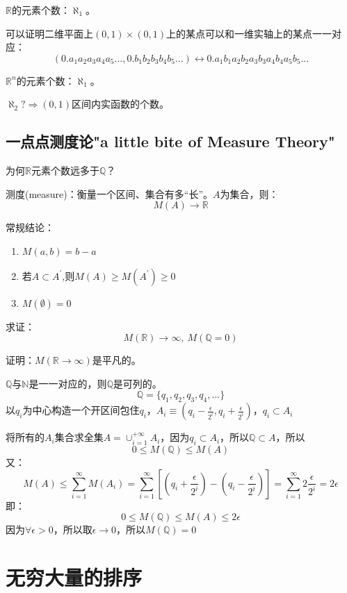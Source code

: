 $\mathbb{R}$的元素个数：$\aleph_1$。

可以证明二维平面上$(0,1)\times(0,1)$上的某点可以和一维实轴上的某点一一对应：
\[(0.a_{1}a_{2}a_{3}a_{4}a_{5}...,0.b_{1}b_{2}b_{3}b_{4}b_{5}...)\leftrightarrow0.a_{1}b_{1}a_{2}b_{2}a_{3}b_{3}a_{4}b_{4}a_{5}b_{5}...\]

$\mathbb{R}^n$的元素个数：$\aleph_1$。

$\aleph_2?\Rightarrow(0,1)$区间内实函数的个数。

\subsection{一点点测度论"a little bite of Measure Theory"}
\label{yddcdl}

为何$\mathbb{R}$元素个数远多于$\mathbb{Q}$？

测度(measure)：衡量一个区间、集合有多“长”。$A$为集合，则：
\[M(A)\rightarrow\mathbb{R}\]

常规结论：

\begin{enumerate}[fullwidth,itemindent=2em]
	\item $M{(a,b)} = b-a$
	\item 若$A\subset A^\prime$,则$M(A) \ge M(A^\prime) \ge 0$
	\item $M(\emptyset) = 0$
\end{enumerate}

求证：
\begin{equation}
M(\mathbb{R})\rightarrow \infty,\ M(\mathbb{Q}=0)
\end{equation}

证明：$M(\mathbb{R}\rightarrow \infty)$是平凡的。

$\mathbb{Q}$与$\mathbb{N}$是一一对应的，则$\mathbb{Q}$是可列的。\\
\[\mathbb{Q}=\{q_1,q_2,q_3,q_4,...\}\]
以$q_i$为中心构造一个开区间包住$q_i$，$A_i \equiv (q_i-\frac{\epsilon}{2^i},q_i+\frac{\epsilon}{2^i})$，${q_i\subset A_i}$

将所有的$A_i$集合求全集$A = \cup_{i=1}^{+\infty}A_i$，因为${q_i \subset A_i}$，所以$\mathbb{Q}\subset A$，所以
\[0 \le M(\mathbb{Q}) \le M(A)\]
又：
\[M(A) \le \sum_{i=1}^{\infty}M(A_i) = \sum_{i=1}^{\infty}[(q_i+\frac{\epsilon}{2^i})-(q_i-\frac{\epsilon}{2^i})] = \sum_{i=1}^{\infty}2\frac{\epsilon}{2^i}=2\epsilon\]
即：
\[0 \le M(\mathbb{Q}) \le M(A) \le 2\epsilon\]
因为$\forall \epsilon >0$，所以取$\epsilon \rightarrow 0$，所以$M(\mathbb{Q})=0$

\section{无穷大量的排序}
\label{wqdldpx}

